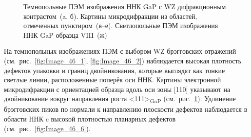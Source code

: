 \begin{figure}[ht]   \caption{Темнопольные ПЭМ изображения ННК GaP с WZ
		дифракционным контрастом~(a, б). Картины микродифракции из областей,
		отмеченных пунктиром~(в--е).  Светлопольные ПЭМ изображения ННК GaP образца
VIII~(ж)}\label{fig:Image_46} \end{figure}

На темнопольных изображениях ПЭМ с выбором WZ брэгговских отражений
(см.~рис.~\cref{fig:Image_46_1}, \cref{fig:Image_46_2}) наблюдается высокая
плотность дефектов упаковки и границ двойникования, которые выглядят как тонкие
светлые линии, расположенные поперёк оси ННК. Картины электронной
микродифракции с ориентацией образца вдоль оси зоны [110] указывают на
двойникование вокруг направления роста <111>\textsubscript{GaP}
(см.~рис.~\cref{fig:Image_46}). Удлинение брэгговских пиков по нормали к
направлению плоскости дефектов наблюдается в области ННК c высокой плотностью
планарных дефектов (см.~рис.~\cref{fig:Image_46_6}).

